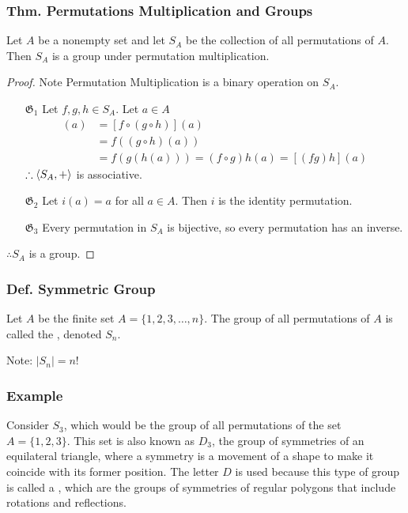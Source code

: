 \subsubsection{Thm. Permutations Multiplication and Groups}
Let $A$ be a nonempty set and let $S_A$ be the collection of all permutations of $A$. Then $S_A$ is a group under permutation multiplication.
\begin{proof}
    Note Permutation Multiplication is a binary operation on $S_A$.
    \begin{itemize}
        \item[$\mathfrak{G}_1$] Let $f,g,h \in S_A$. Let $a \in A$
        \begin{align*}
            [f(gh)](a) & = [f \circ (g \circ h)](a) \\
            & = f((g\circ h)(a)) \\
            & = f(g(h(a))) = (f\circ g)h(a) = [(fg)h](a)
        \end{align*}
        $\therefore \langle S_A, + \rangle$ is associative.
        \item[$\mathfrak{G}_2$] Let $i(a) = a$ for all $a \in A$. Then $i$ is the identity permutation.
        \item[$\mathfrak{G}_3$] Every permutation in $S_A$ is bijective, so every permutation has an inverse.
    \end{itemize}
    $\therefore S_A$ is a group.
\end{proof}

\subsubsection{Def. Symmetric Group}
Let $A$ be the finite set $A =\{1,2,3,\ldots,n\}$. The group of all permutations of $A$ is called the , denoted $S_n$.

Note: $|S_n| = n!$

\subsubsection*{Example}
Consider $S_3$, which would be the group of all permutations of the set $A = \{1,2,3\}$. This set is also known as $D_3$, the group of symmetries of an equilateral triangle, where a symmetry is a movement of a shape to make it coincide with its former position. The letter $D$ is used because this type of group is called a , which are the groups of symmetries of regular polygons that include rotations and reflections.

